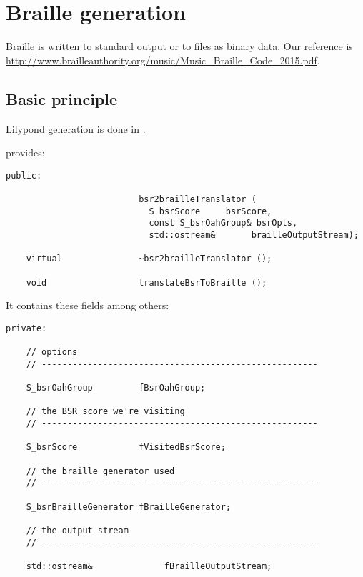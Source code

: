 
\chapter{Braille generation}


Braille is written to standard output or to files as binary data. Our reference is \url{http://www.brailleauthority.org/music/Music_Braille_Code_2015.pdf}.


\section{Basic principle}

Lilypond generation is done in .

 provides:
\begin{lstlisting}[language=CPlusPlus]
  public:

                          bsr2brailleTranslator (
                            S_bsrScore     bsrScore,
                            const S_bsrOahGroup& bsrOpts,
                            std::ostream&       brailleOutputStream);

    virtual               ~bsr2brailleTranslator ();

    void                  translateBsrToBraille ();
\end{lstlisting}

It contains these fields among others:
\begin{lstlisting}[language=CPlusPlus]
  private:

    // options
    // ------------------------------------------------------

    S_bsrOahGroup         fBsrOahGroup;

    // the BSR score we're visiting
    // ------------------------------------------------------

    S_bsrScore            fVisitedBsrScore;

    // the braille generator used
    // ------------------------------------------------------

    S_bsrBrailleGenerator fBrailleGenerator;

    // the output stream
    // ------------------------------------------------------

    std::ostream&              fBrailleOutputStream;
\end{lstlisting}


